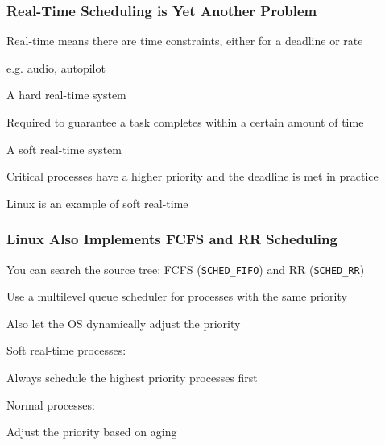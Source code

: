   \begin{frame}
    \frametitle{Real-Time Scheduling is Yet Another Problem}

    Real-time means there are time constraints, either for a deadline or rate

    \hspace{2em} e.g. audio, autopilot

    \vspace{2em}

    A hard real-time system

    \hspace{2em} Required to guarantee a task completes within a certain amount
    of time

    \vspace{2em}

    A soft real-time system

    \hspace{2em} Critical processes have a higher priority and the deadline is
    met in practice

    \vspace{2em}

    Linux is an example of soft real-time
  \end{frame}

  \begin{frame}
    \frametitle{Linux Also Implements FCFS and RR Scheduling}

    You can search the source tree: FCFS (\texttt{SCHED\_FIFO}) and RR (\texttt{SCHED\_RR})

    \vspace{2em}

    Use a multilevel queue scheduler for processes with the same priority

    \hspace{2em} Also let the OS dynamically adjust the priority

    \vspace{2em}

    Soft real-time processes:

    \hspace{2em} Always schedule the highest priority processes first

    Normal processes:

    \hspace{2em} Adjust the priority based on aging
  \end{frame}

